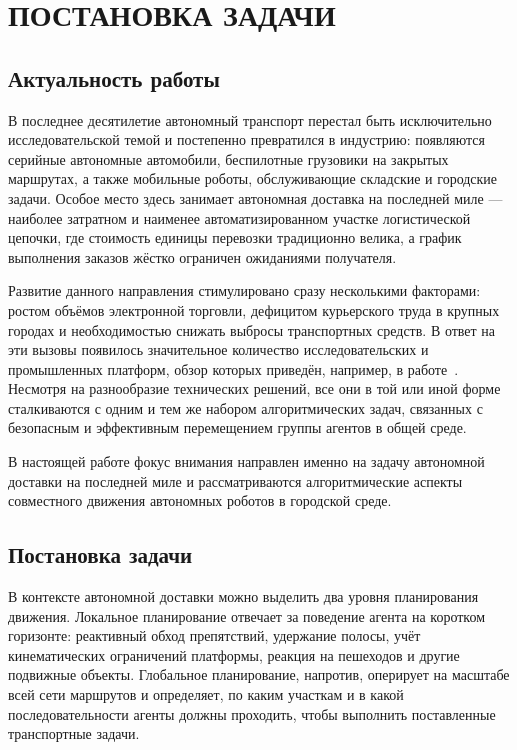 \section{ПОСТАНОВКА ЗАДАЧИ}

\subsection{Актуальность работы}

В последнее десятилетие автономный транспорт перестал быть исключительно исследовательской темой и 
постепенно превратился в индустрию: появляются серийные автономные автомобили, беспилотные грузовики 
на закрытых маршрутах, а также мобильные роботы, обслуживающие складские и городские задачи. Особое 
место здесь занимает автономная доставка на последней миле --- наиболее затратном и наименее 
автоматизированном участке логистической цепочки, где стоимость единицы перевозки традиционно велика,
а график выполнения заказов жёстко ограничен ожиданиями получателя.

Развитие данного направления стимулировано сразу несколькими факторами: ростом объёмов электронной 
торговли, дефицитом курьерского труда в крупных городах и необходимостью снижать выбросы транспортных 
средств. В ответ на эти вызовы появилось значительное количество исследовательских и промышленных 
платформ, обзор которых приведён, например, в работе~\cite{last-mile-delivery-robots}. Несмотря на 
разнообразие технических решений, все они в той или иной форме сталкиваются с одним и тем же набором 
алгоритмических задач, связанных с безопасным и эффективным перемещением группы агентов в общей среде.

В настоящей работе фокус внимания направлен именно на задачу автономной доставки на последней миле 
и рассматриваются алгоритмические аспекты совместного движения автономных роботов в городской среде.

\subsection{Постановка задачи}

В контексте автономной доставки можно выделить два уровня планирования движения. Локальное 
планирование отвечает за поведение агента на коротком горизонте: реактивный обход препятствий, 
удержание полосы, учёт кинематических ограничений платформы, реакция на пешеходов и другие подвижные 
объекты. Глобальное планирование, напротив, оперирует на масштабе всей сети маршрутов и определяет, 
по каким участкам и в какой последовательности агенты должны проходить, чтобы выполнить поставленные 
транспортные задачи.

